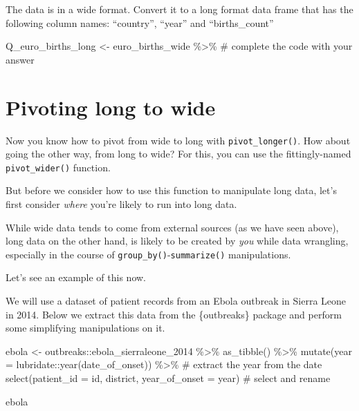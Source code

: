 \documentclass[
  letterpaper,
  DIV=11,
  numbers=noendperiod]{scrreprt}
\newenvironment{Shaded}{\begin{snugshade}}{\end{snugshade}}
\newcommand{\AttributeTok}[1]{\textcolor[rgb]{0.40,0.45,0.13}{#1}}
\newcommand{\CommentTok}[1]{\textcolor[rgb]{0.37,0.37,0.37}{#1}}
\newcommand{\FunctionTok}[1]{\textcolor[rgb]{0.28,0.35,0.67}{#1}}
\newcommand{\NormalTok}[1]{\textcolor[rgb]{0.00,0.23,0.31}{#1}}
\newcommand{\OtherTok}[1]{\textcolor[rgb]{0.00,0.23,0.31}{#1}}
\newcommand{\SpecialCharTok}[1]{\textcolor[rgb]{0.37,0.37,0.37}{#1}}
\begin{document}
\begin{tcolorbox}
The data is in a wide format. Convert it to a long format data frame
that has the following column names: ``country'', ``year'' and
``births\_count''

\begin{Shaded}
\begin{Highlighting}[]
\NormalTok{Q\_euro\_births\_long }\OtherTok{\textless{}{-}} 
\NormalTok{  euro\_births\_wide }\SpecialCharTok{\%\textgreater{}\%} \CommentTok{\# complete the code with your answer}
\end{Highlighting}
\end{Shaded}

\end{tcolorbox}

\hypertarget{pivoting-long-to-wide}{%
\section{Pivoting long to wide}\label{pivoting-long-to-wide}}

Now you know how to pivot from wide to long with
\texttt{pivot\_longer()}. How about going the other way, from long to
wide? For this, you can use the fittingly-named \texttt{pivot\_wider()}
function.

But before we consider how to use this function to manipulate long data,
let's first consider \emph{where} you're likely to run into long data.

While wide data tends to come from external sources (as we have seen
above), long data on the other hand, is likely to be created by
\emph{you} while data wrangling, especially in the course of
\texttt{group\_by()}-\texttt{summarize()} manipulations.

Let's see an example of this now.

We will use a dataset of patient records from an Ebola outbreak in
Sierra Leone in 2014. Below we extract this data from the \{outbreaks\}
package and perform some simplifying manipulations on it.

\begin{Shaded}
\begin{Highlighting}[]
\NormalTok{ebola }\OtherTok{\textless{}{-}} 
\NormalTok{  outbreaks}\SpecialCharTok{::}\NormalTok{ebola\_sierraleone\_2014 }\SpecialCharTok{\%\textgreater{}\%} 
  \FunctionTok{as\_tibble}\NormalTok{() }\SpecialCharTok{\%\textgreater{}\%} 
  \FunctionTok{mutate}\NormalTok{(}\AttributeTok{year =}\NormalTok{ lubridate}\SpecialCharTok{::}\FunctionTok{year}\NormalTok{(date\_of\_onset)) }\SpecialCharTok{\%\textgreater{}\%} \CommentTok{\# extract the year from the date}
  \FunctionTok{select}\NormalTok{(}\AttributeTok{patient\_id =}\NormalTok{ id, district, }\AttributeTok{year\_of\_onset =}\NormalTok{ year) }\CommentTok{\# select and rename}

\NormalTok{ebola}
\end{Highlighting}
\end{Shaded}
\end{document}
